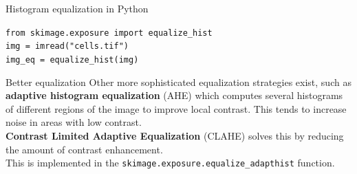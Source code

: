 \documentclass[9pt, aspectratio=169]{beamer}
\begin{document}
\begin{frame}
	{Histogram equalization in Python}
	\begin{codebox}
		\texttt{from skimage.exposure import equalize\_hist\\
			img = imread("cells.tif")\\
			img\_eq = equalize\_hist(img)
		}
	\end{codebox}

\end{frame}

\begin{frame}
	{Better equalization}
	Other more sophisticated equalization strategies exist, such as \textbf{adaptive histogram equalization} (AHE) which computes several histograms of different regions of the image to improve local contrast. This tends to increase noise in areas with low contrast.\\
	\vspace{2em}
	\pause
	\textbf{Contrast Limited Adaptive Equalization} (CLAHE) solves this by reducing the amount of contrast enhancement.\\
	This is implemented in the \texttt{skimage.exposure.equalize\_adapthist} function.
\end{frame}
\end{document}
